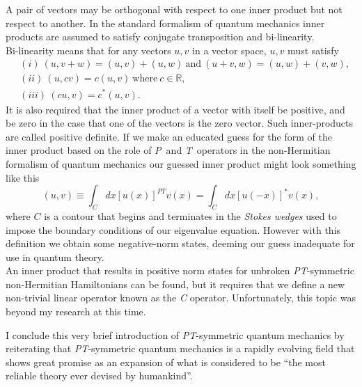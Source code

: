 \documentclass[10pt, a4paper, singlespacing]{report}
\newcommand\PT{\emph{PT}}
\newcommand\PP{\emph{P}}
\newcommand\TT{\emph{T}}
\begin{document}
A pair of vectors may be orthogonal with respect to one inner product but not respect to another. In the standard formalism of quantum mechanics inner products are assumed to satisfy conjugate transposition and bi-linearity. \\Bi-linearity means that for any vectors $u, v$ in a vector space, $u, v$ must satisfy\cite{Jones-Smith} 
\begin{equation}
\begin{split}
&(i)\ (u, v + w) = (u, v) + (u, w) \mathrm{\ and\ } (u + v, w) = (u, w) + (v, w),\\
&(ii)\ (u, cv) = c(u, v) \mathrm{\ where\ } c \in \mathds{R},\\
&(iii)\ (cu, v) = c^*(u, v).
\end{split}
\end{equation}
It is also required that the inner product of a vector with itself be positive,
and be zero in the case that one of the vectors is the zero vector. Such inner-products are called positive definite\cite{Jones-Smith}.
If we make an educated guess for the form of the inner product based on the role of \PP\ and \TT\ operators in the non-Hermitian formalism of quantum mechanics our guessed inner product might look something like this
\begin{equation}
(u, v) \equiv \int_C dx [u(x)]^{PT} v(x) = \int_C dx [u(-x)]^*v(x),
\end{equation}
where $C$ is a contour that begins and terminates in the \emph{Stokes wedges} used to impose the boundary conditions of our eigenvalue equation. However with this definition we obtain some negative-norm states, deeming our guess inadequate for use in quantum theory\cite{BenderPT}\cite{Jones-Smith}\cite{Moiseyev}.\\
An inner product that results in positive norm states for unbroken \PT-symmetric non-Hermitian Hamiltonians can be found, but it requires that we define a new non-trivial linear operator known as the \emph{C} operator. Unfortunately, this topic was beyond my research at this time.

I conclude this very brief introduction of \PT-symmetric quantum mechanics by reiterating that \PT-symmetric quantum mechanics is a rapidly evolving field that shows great promise as an expansion of what is considered to be ``the most reliable theory ever devised by humankind''.


\end{document}
